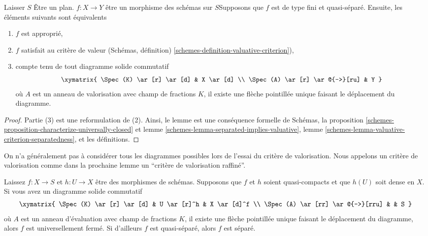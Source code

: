 \begin{lemma}

\label{lemma-characterize-proper}

\begin{reference}\cite[II Theorem 7.3.8]{EGA}\end{reference}

Laisser $S$ Être un plan. $f : X \to Y$ être un morphisme des schémas sur $S$Supposons que $f$ est de type fini et quasi-séparé. Ensuite, les éléments suivants sont équivalents

\begin{enumerate}

\item  $f$ est approprié,
\item  $f$ satisfait au critère de valeur (Schémas, définition) \ref{schemes-definition-valuative-criterion}),
\item compte tenu de tout diagramme solide commutatif
$$
\xymatrix{
\Spec(K) \ar[r] \ar[d] & X \ar[d] \\
\Spec(A) \ar[r] \ar@{-->}[ru] & Y
}
$$
où $A$ est un anneau de valorisation avec champ de fractions $K$, il existe une flèche pointillée unique faisant le déplacement du diagramme.

\end{enumerate}

\end{lemma}

\begin{proof}
Partie (3) est une reformulation de (2). Ainsi, le lemme est une conséquence formelle de Schémas, la proposition \ref{schemes-proposition-characterize-universally-closed} et lemme \ref{schemes-lemma-separated-implies-valuative}, lemme \ref{schemes-lemma-valuative-criterion-separatedness}, et les définitions.
\end{proof}

\noindent
On n'a généralement pas à considérer tous les diagrammes possibles lors de l'essai du critère de valorisation. Nous appelons un critère de valorisation comme dans la prochaine lemme un ``critère de valorisation raffiné''.

\begin{lemma}

\label{lemma-refined-valuative-criterion-universally-closed}
Laissez $f : X \to S$ et $h : U \to X$ être des morphismes de schémas. Supposons que $f$ et $h$ soient quasi-compacts et que $h(U)$ soit dense en $X$. Si vous avez un diagramme solide commutatif $$
\xymatrix{
\Spec(K) \ar[r] \ar[d] & U \ar[r]^h & X \ar[d]^f \\
\Spec(A) \ar[rr] \ar@{-->}[rru] & & S
}
$$ où $A$ est un anneau d'évaluation avec champ de fractions $K$, il existe une flèche pointillée unique faisant le déplacement du diagramme, alors $f$ est universellement fermé. Si d'ailleurs $f$ est quasi-séparé, alors $f$ est séparé.
\end{lemma}

